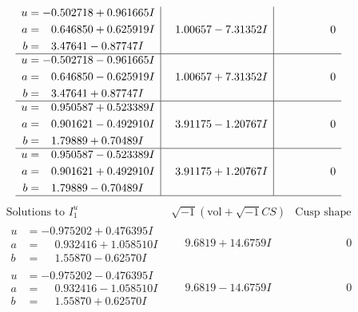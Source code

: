 \documentclass[1p]{elsarticle_modified}
\theoremstyle{definition}
\newcommand{\I}{\sqrt{-1}}
\begin{document}
$$\begin{array}{c|c|c}
\begin{aligned}
u &= -0.502718 + 0.961665 I \\
a &= \phantom{-}0.646850 + 0.625919 I \\
b &= \phantom{-}3.47641 - 0.87747 I\end{aligned}
 & \phantom{-}1.00657 - 7.31352 I & \phantom{-0.000000 } 0 \\ \hline\begin{aligned}
u &= -0.502718 - 0.961665 I \\
a &= \phantom{-}0.646850 - 0.625919 I \\
b &= \phantom{-}3.47641 + 0.87747 I\end{aligned}
 & \phantom{-}1.00657 + 7.31352 I & \phantom{-0.000000 } 0 \\ \hline\begin{aligned}
u &= \phantom{-}0.950587 + 0.523389 I \\
a &= \phantom{-}0.901621 - 0.492910 I \\
b &= \phantom{-}1.79889 + 0.70489 I\end{aligned}
 & \phantom{-}3.91175 - 1.20767 I & \phantom{-0.000000 } 0 \\ \hline\begin{aligned}
u &= \phantom{-}0.950587 - 0.523389 I \\
a &= \phantom{-}0.901621 + 0.492910 I \\
b &= \phantom{-}1.79889 - 0.70489 I\end{aligned}
 & \phantom{-}3.91175 + 1.20767 I & \phantom{-0.000000 } 0\\
 \hline 
 \end{array}$$\newpage$$\begin{array}{c|c|c}  
\text{Solutions to }I^u_{1}& \I (\text{vol} + \sqrt{-1}CS) & \text{Cusp shape}\\
 \hline 
\begin{aligned}
u &= -0.975202 + 0.476395 I \\
a &= \phantom{-}0.932416 + 1.058510 I \\
b &= \phantom{-}1.55870 - 0.62570 I\end{aligned}
 & \phantom{-}9.6819 + 14.6759 I & \phantom{-0.000000 } 0 \\ \hline\begin{aligned}
u &= -0.975202 - 0.476395 I \\
a &= \phantom{-}0.932416 - 1.058510 I \\
b &= \phantom{-}1.55870 + 0.62570 I\end{aligned}
 & \phantom{-}9.6819 - 14.6759 I & \phantom{-0.000000 } 0 \\ \hline\begin{aligned}

\end{aligned}
\end{array}$$
\end{document}
